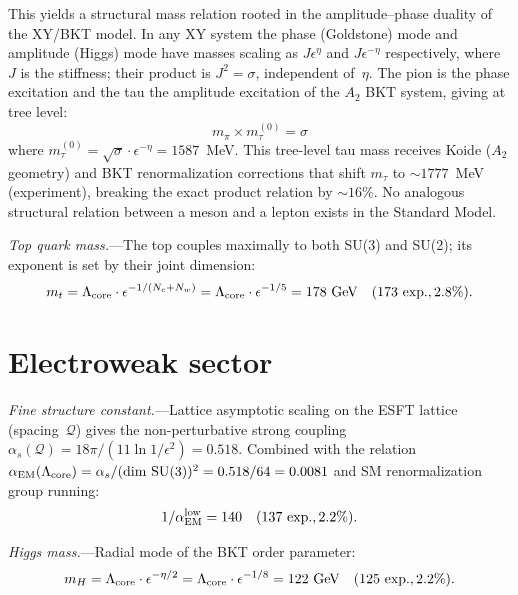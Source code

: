 ﻿\documentclass[aps,prl,twocolumn,superscriptaddress,showpacs]{revtex4-2}
\newcommand{\Qoppa}{\mathcal{Q}} %
\begin{document}
This yields a structural mass relation rooted in the amplitude--phase
duality of the XY/BKT model. In any XY system the phase (Goldstone)
mode and amplitude (Higgs) mode have masses scaling as $J\epsilon^\eta$
and $J\epsilon^{-\eta}$ respectively, where $J$ is the stiffness; their
product is $J^2 = \sigma$, independent of~$\eta$. The pion is the
phase excitation and the tau the amplitude excitation of the $A_2$ BKT
system, giving at tree level:
\begin{equation}\label{eq:pitau}
m_\pi \times m_\tau^{(0)} = \sigma
\end{equation}
where $m_\tau^{(0)} = \sqrt{\sigma}\cdot\epsilon^{-\eta} = 1587$~MeV.
This tree-level tau mass receives Koide ($A_2$ geometry) and BKT
renormalization corrections that shift $m_\tau$ to $\sim\!1777$~MeV
(experiment), breaking the exact product relation by $\sim\!16\%$.
No analogous structural relation between a meson and a lepton exists
in the Standard Model.

\textit{Top quark mass.}---The top couples maximally to both SU(3)
and SU(2); its exponent is set by their joint dimension:
\begin{equation}\label{eq:mt}
m_t = \Lambda_{\rm core}\cdot\epsilon^{-1/(N_c+N_w)}
= \Lambda_{\rm core}\cdot\epsilon^{-1/5} = 178~\text{GeV}\quad (173~\text{exp.}, 2.8\%).
\end{equation}


\section{Electroweak sector}

\textit{Fine structure constant.}---Lattice asymptotic scaling on the
ESFT lattice (spacing~$\Qoppa$) gives the non-perturbative strong
coupling $\alpha_s(\Qoppa) = 18\pi/(11\ln 1/\epsilon^2) = 0.518$.
Combined with the relation $\alpha_{\rm EM}(\Lambda_{\rm core})
= \alpha_s/(\dim\,\mathrm{SU}(3))^2 = 0.518/64 = 0.0081$ and SM
renormalization group running:
\begin{equation}
1/\alpha_{\rm EM}^{\rm low} = 140 \quad (137~\text{exp.}, 2.2\%).
\end{equation}

\textit{Higgs mass.}---Radial mode of the BKT order parameter:
\begin{equation}\label{eq:mH}
m_H = \Lambda_{\rm core}\cdot\epsilon^{-\eta/2}
= \Lambda_{\rm core}\cdot\epsilon^{-1/8} = 122~\text{GeV}\quad (125~\text{exp.}, 2.2\%).
\end{equation}
\end{document}
